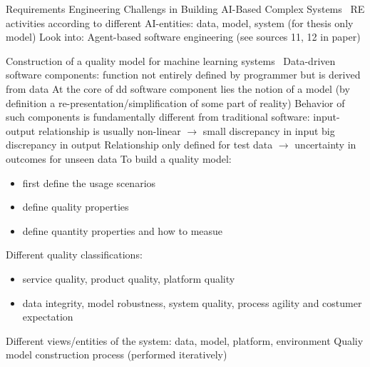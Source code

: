 Requirements Engineering Challengs in Building AI-Based Complex Systems~\cite{belani_requirements_2019}
RE activities according to different AI-entities: data, model, system (for thesis only model)
Look into: Agent-based software engineering (see sources 11, 12 in paper)

Construction of a quality model for machine learning systems~\cite{siebert_construction_2021}
Data-driven software components: function not entirely defined by programmer but is derived from data
At the core of dd software component lies the notion of a model (by definition a
re-presentation/simplification of some part of reality)
Behavior of such components is fundamentally different from traditional software: input-output
relationship is usually non-linear $\rightarrow$ small discrepancy in input big discrepancy in output
Relationship only defined for test data $\rightarrow$ uncertainty in outcomes for unseen data
To build a quality model:
\begin{itemize}
    \item first define the usage scenarios
    \item define quality properties
    \item define quantity properties and how to measue
\end{itemize}
Different quality classifications:
\begin{itemize}
    \item service quality, product quality, platform quality
    \item  data integrity, model robustness, system quality, process agility and costumer expectation
\end{itemize}
Different views/entities of the system: data, model, platform, environment
Qualiy model construction process (performed iteratively)
